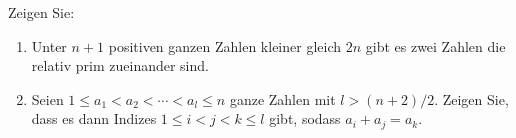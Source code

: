 
\begin{exercise}

Zeigen Sie:

\begin{enumerate}[label = (\alph*)]
    \item Unter $n + 1$ positiven ganzen Zahlen kleiner gleich $2n$ gibt
    es zwei Zahlen die relativ prim zueinander sind.
    \item Seien $1 \leq a_1 < a_2 < \cdots < a_l \leq n$ ganze Zahlen
    mit $l > (n + 2)/2$. Zeigen Sie, dass es dann Indizes $1 \leq i < j < k \leq l$ gibt,
    sodass $a_i + a_j = a_k$.
\end{enumerate}
\end{exercise}


\begin{solution}

\phantom{}

\end{solution}

